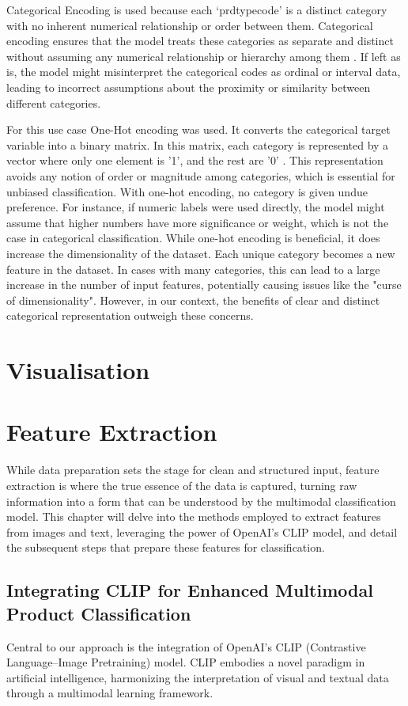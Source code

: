 Categorical Encoding is used because each ‘prdtypecode’ is a distinct category with no inherent numerical relationship or order between them. Categorical encoding ensures that the model treats these categories as separate and distinct without assuming any numerical relationship or hierarchy among them \cite{potdar-2017}. If left as is, the model might misinterpret the categorical codes as ordinal or interval  data, leading to incorrect assumptions about the proximity or similarity between different categories.

For this use case One-Hot encoding was used. It converts the categorical target variable into a binary matrix. In this matrix, each category is represented by a vector where only one element is '1', and the rest are '0' \cite{cerda-2018}. This representation avoids any notion of order or magnitude among categories, which is essential for unbiased classification.
With one-hot encoding, no category is given undue preference. For instance, if numeric labels were used directly, the model might assume that higher numbers have more significance or weight, which is not the case in categorical classification.
While one-hot encoding is beneficial, it does increase the dimensionality of the dataset. Each unique category becomes a new feature in the dataset. In cases with many categories, this can lead to a large increase in the number of input features, potentially causing issues like the "curse of dimensionality"\cite{altman-2018}. However, in our context, the benefits of clear and distinct categorical representation outweigh these concerns.

\section{Visualisation}

\section{Feature Extraction}

While data preparation sets the stage for clean and structured input, feature extraction is where the true essence of the data is captured, turning raw information into a form that can be understood by the multimodal classification model. This chapter will delve into the methods employed to extract features from images and text, leveraging the power of OpenAI's CLIP model, and detail the subsequent steps that prepare these features for classification.

\subsection{Integrating CLIP for Enhanced Multimodal Product Classification}
Central to our approach is the integration of OpenAI's CLIP (Contrastive Language–Image Pretraining) model. CLIP embodies a novel paradigm in artificial intelligence, harmonizing the interpretation of visual and textual data through a multimodal learning framework.

